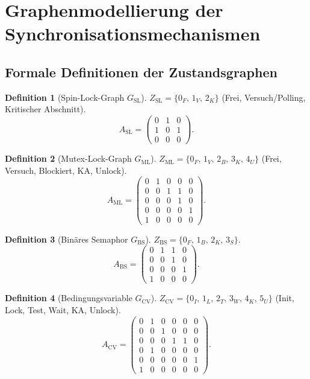 ﻿\documentclass[a4paper,12pt]{article}
\theoremstyle{definition}
\newtheorem{definition}{Definition}
\begin{document}
\section{Graphenmodellierung der Syn\-chro\-ni\-sa\-tions\-me\-cha\-nis\-men}
\label{sec:modellierung}

\subsection{Formale Definitionen der Zustandsgraphen}

\begin{definition}[Spin-Lock-Graph $G_{\mathrm{SL}}$]
$Z_{\mathrm{SL}} = \{0_F,\, 1_V,\, 2_K\}$
(Frei, Versuch/Polling, Kritischer Abschnitt).
\[
  A_{\mathrm{SL}} =
  \begin{pmatrix} 0 & 1 & 0 \\ 1 & 0 & 1 \\ 0 & 0 & 0 \end{pmatrix}.
\]
\end{definition}

\begin{definition}[Mutex-Lock-Graph $G_{\mathrm{ML}}$]
$Z_{\mathrm{ML}} = \{0_F,\, 1_V,\, 2_B,\, 3_K,\, 4_U\}$
(Frei, Versuch, Blockiert, KA, Unlock).
\[
  A_{\mathrm{ML}} =
  \begin{pmatrix}
    0&1&0&0&0\\0&0&1&1&0\\0&0&0&1&0\\0&0&0&0&1\\1&0&0&0&0
  \end{pmatrix}.
\]
\end{definition}

\begin{definition}[Binäres Semaphor $G_{\mathrm{BS}}$]
$Z_{\mathrm{BS}} = \{0_F,\, 1_B,\, 2_K,\, 3_S\}$.
\[
  A_{\mathrm{BS}} =
  \begin{pmatrix}
    0&1&1&0\\0&0&1&0\\0&0&0&1\\1&0&0&0
  \end{pmatrix}.
\]
\end{definition}

\begin{definition}[Bedingungsvariable $G_{\mathrm{CV}}$]
$Z_{\mathrm{CV}} = \{0_I,\,1_L,\,2_T,\,3_W,\,4_K,\,5_U\}$
(Init, Lock, Test, Wait, KA, Unlock).
\[
  A_{\mathrm{CV}} =
  \begin{pmatrix}
    0&1&0&0&0&0\\0&0&1&0&0&0\\0&0&0&1&1&0\\
    0&1&0&0&0&0\\0&0&0&0&0&1\\1&0&0&0&0&0
  \end{pmatrix}.
\]
\end{definition}
\end{document}
